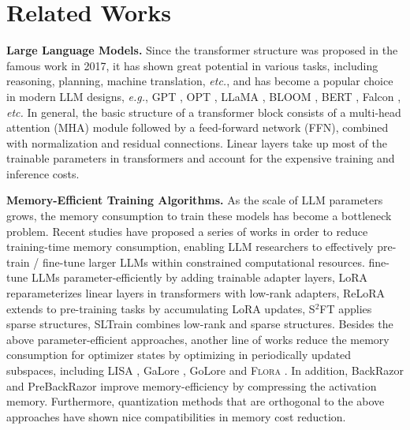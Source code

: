 \vspace{-0.25em}
\section{Related Works}
\vspace{-0.25em}
    \textbf{Large Language Models. }Since the transformer structure was proposed in the famous work \cite{vaswani2017attention} in 2017, it has shown great potential in various tasks, including reasoning, planning, machine translation, \textit{etc.}, and has become a popular choice in modern LLM designs, \textit{e.g.}, GPT \citep{radford2018improving,radford2019language,brown2020language}, OPT \citep{zhang2022opt}, LLaMA \citep{touvron2023llama,touvron2023Bllama,dubey2024llama}, BLOOM \citep{le2023bloom}, BERT \citep{devlin2018bert}, Falcon \citep{penedo2023refinedweb}, \textit{etc.} In general, the basic structure of a transformer block consists of a multi-head attention (MHA) module followed by a feed-forward network (FFN), combined with normalization and residual connections. Linear layers take up most of the trainable parameters in transformers and account for the expensive training and inference costs.

\textbf{Memory-Efficient Training Algorithms. }As the scale of LLM parameters grows, the memory consumption to train these models has become a bottleneck problem. Recent studies have proposed a series of works in order to reduce training-time memory consumption, enabling LLM researchers to effectively pre-train / fine-tune larger LLMs within constrained computational resources. \cite{houlsby2019parameter,pfeiffer2020adapterhub} fine-tune LLMs parameter-efficiently by adding trainable adapter layers, LoRA \citep{hu2021lora} reparameterizes linear layers in transformers with low-rank adapters, ReLoRA \citep{lialin2023relora} extends to pre-training tasks by accumulating LoRA updates, S$^2$FT \citep{yang2024sft} applies sparse structures, SLTrain \citep{han2024sltrain} combines low-rank and sparse structures. Besides the above parameter-efficient approaches, another line of works reduce the memory consumption for optimizer states by optimizing in periodically updated subspaces, including LISA \citep{pan2024lisa}, GaLore \citep{zhao2024galore}, GoLore \citep{he2024subspace} and \textsc{Flora} \citep{hao2024flora}. In addition, BackRazor \citep{jiang2022back} and PreBackRazor \citep{yu2024sheared} improve memory-efficiency by compressing the activation memory. Furthermore, quantization methods \citep{micikevicius2017mixed,dettmers2024qlora} that are orthogonal to the above approaches have shown nice compatibilities in memory cost reduction. 

